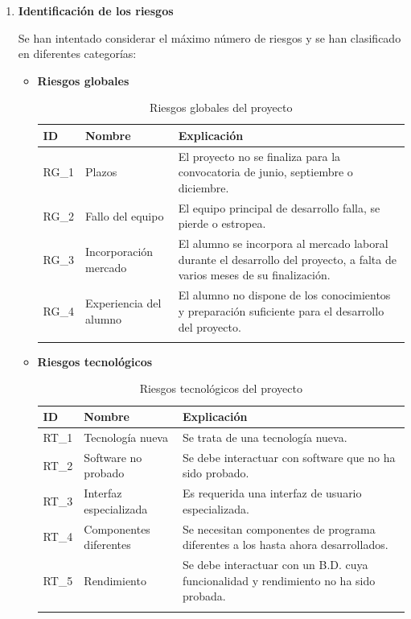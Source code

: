 \begin{enumerate}

\item \textbf{Identificación de los riesgos}

Se han intentado considerar el máximo número de riesgos y se han clasificado en diferentes categorías:

\begin{itemize}

\item \textbf{Riesgos globales}
\begingroup
\renewcommand\arraystretch{1.3}

\begin{longtable}{l p{5cm} p{9cm}}
\hline
\textbf{ID} & \textbf{Nombre} & \textbf{Explicación} \\
\hline
\endhead
\endfoot
RG\_1 & 
Plazos &
El proyecto no se finaliza para la convocatoria de junio, septiembre o diciembre.
 \\
RG\_2 & 
Fallo del equipo &
El equipo principal de desarrollo falla, se pierde o estropea. 
 \\
RG\_3 & 
Incorporación mercado &
El alumno se incorpora al mercado laboral durante el desarrollo del proyecto, a falta de varios meses de su finalización.
 \\
RG\_4 & 
Experiencia del alumno &
El alumno no dispone de los conocimientos y preparación suficiente para el desarrollo del proyecto. 
 \\
\hline
\caption{Riesgos globales del proyecto}\label{ries_glob}\\
\end{longtable}

\item \textbf{Riesgos tecnológicos}
\begin{longtable}{l p{5cm} p{9cm}}
\hline
\textbf{ID} & \textbf{Nombre} & \textbf{Explicación} \\
\hline
\endhead
\endfoot
RT\_1 & 
Tecnología nueva &
Se trata de una tecnología nueva.
 \\
RT\_2 & 
Software no probado &
Se debe interactuar con software que no ha sido probado. 
 \\
RT\_3 & 
Interfaz especializada &
Es requerida una interfaz de usuario especializada.
 \\
RT\_4 & 
Componentes diferentes &
Se necesitan componentes de programa diferentes a los hasta ahora desarrollados.
 \\
RT\_5 & 
Rendimiento &
Se debe interactuar con un B.D. cuya funcionalidad y rendimiento no ha sido probada.
 \\
\hline
\caption{Riesgos tecnológicos del proyecto}\label{ries_tecno}\\
\end{longtable}


\end{itemize}
\end{enumerate}
